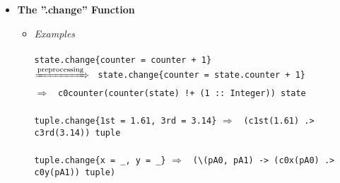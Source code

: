 \documentclass[diploma]{softlab-thesis}
\def\H{Haskell}
\def\lra{$\Longrightarrow$\ }
\def\prarr{$\xRightarrow{\text{preprocessing}}$\ }
\begin{document}
\begin{itemize}
\begin{itemize}
\item
\textit{Description}\\\\
Postfix functions are projection functions that are generated automatically by
the translation of the relevant \verb|tuple_type| definition or they are the
projection functions for product types (\verb|_.1st _.2nd etc|). They are
translated into regular \H\ functions (as are the record accessor functions of
\H) with their argument in parenthesis. For \verb|_.1st _.2nd etc| a 'p'
for "projection" is prepended to make it a valid \H\ function.
\\\\
The projection functions for product types are polymorphic and work on tuples
of any size (in principle, for size $\leq$ 5 for now). This is achieved by
making them polymorphic through the following class (for p1st and similar
classes for the rest):
\begin{verbatim}
class IsFirst' a b | b -> a where
  p1st :: b -> a
\end{verbatim}
And the following instances:

\begin{verbatim}
instance IsFirst' a (a, b) where
  p1st = fst

instance IsFirst' a (a, b, c) where
  p1st = \(a, _, _) -> a

instance IsFirst' a (a, b, c, d) where
  p1st = \(a, _, _, _) -> a

...
\end{verbatim}
\end{itemize}

\item
\textbf{The ”.change” Function}

\begin{itemize}
\item
\textit{Examples}\\\\
\texttt{state.change\{counter = counter + 1\}}\\
\prarr
\texttt{state.change\{counter = state.counter + 1\}}\\
\lra
\verb|c0counter(counter(state) !+ (1 :: Integer)) state|
\\\\
\texttt{tuple.change\{1st = 1.61, 3rd = 3.14\}} \lra
\texttt{(c1st(1.61) .> c3rd(3.14)) tuple}
\\\\
\verb|tuple.change{x = _, y = _}| \lra
\verb|(\(pA0, pA1) -> (c0x(pA0) .> c0y(pA1)) tuple)| \\


\end{itemize}
\end{itemize}
\end{document}
